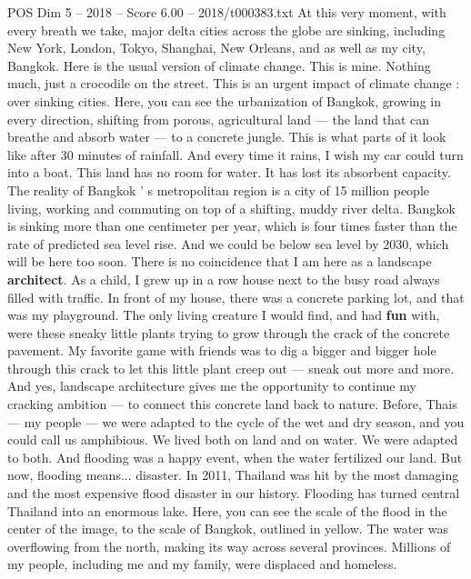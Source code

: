 \begin{textsample}{POS Dim 5 – 2018 – Score 6.00 – 2018/t000383.txt}  \label{ex:f5_pos_065}
At this very moment, with every breath we take, major delta cities across the globe are sinking, including New York, London, Tokyo, Shanghai, New Orleans, and as well as my city, Bangkok.
Here is the usual version of climate change.
This is mine.
Nothing much, just a crocodile on the street.
This is an urgent impact of climate change : over sinking cities.
Here, you can see the urbanization of Bangkok, growing in every direction, shifting from porous, agricultural land — the land that can breathe and absorb water — to a concrete jungle.
This is what parts of it look like after 30 minutes of rainfall.
And every time it rains, I wish my car could turn into a boat.
This land has no room for water.
It has lost its absorbent capacity.
The reality of Bangkok ' s metropolitan region is a city of 15 million people living, working and commuting on top of a shifting, muddy river delta.
Bangkok is sinking more than one centimeter per year, which is four times faster than the rate of predicted sea level rise.
And we could be below sea level by 2030, which will be here too soon.
There is no coincidence that I am here as a landscape \textbf{architect}.
As a child, I grew up in a row house next to the busy road always filled with traffic.
In front of my house, there was a concrete parking lot, and that was my playground.
The only living creature I would find, and had \textbf{fun} with, were these sneaky little plants trying to grow through the crack of the concrete pavement.
My favorite game with friends was to dig a bigger and bigger hole through this crack to let this little plant creep out — sneak out more and more.
And yes, landscape architecture gives me the opportunity to continue my cracking ambition — to connect this concrete land back to nature.
Before, Thais — my people — we were adapted to the cycle of the wet and dry season, and you could call us amphibious.
We lived both on land and on water.
We were adapted to both.
And flooding was a happy event, when the water fertilized our land.
But now, flooding means... disaster.
In 2011, Thailand was hit by the most damaging and the most expensive flood disaster in our history.
Flooding has turned central Thailand into an enormous lake.
Here, you can see the scale of the flood in the center of the image, to the scale of Bangkok, outlined in yellow.
The water was overflowing from the north, making its way across several provinces.
Millions of my people, including me and my family, were displaced and homeless.

\end{textsample}
